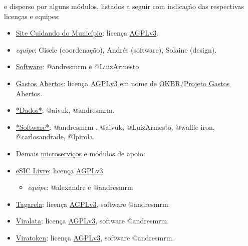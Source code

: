 \documentclass[letterpaper,10pt,english]{sphinxmanual}
\begin{document}
e disperso por alguns módulos, listados a seguir com indicação das
respectivas licenças e equipes:
\begin{itemize}
\item {} 
\href{https://github.com/okfn-brasil/cuidando2.git}{Site Cuidando do
Município}: licença \href{https://github.com/okfn-brasil/cuidando2/blob/master/LICENSE.txt}{AGPLv3}.

\item {} 
\emph{equipe}: Gisele (coordenação), Andrés (software), Solaine (design).

\item {} 
\href{https://github.com/okfn-brasil/cuidando2/graphs/contributors}{Software}:
@andresmrm e @LuizArmesto

\item {} 
\href{https://github.com/okfn-brasil/gastos\_abertos}{Gastos Abertos}:
licença \href{https://github.com/okfn-brasil/gastos\_abertos/blob/master/LICENSE}{AGPLv3}
em nome de \href{http://br.okfn.org/}{OKBR}/\href{http://wiki.okfn.org/Open\_Knowledge\_Brasil/Gastos\_Abertos}{Projeto Gastos
Abertos}.

\item {} 
\href{https://github.com/okfn-brasil/gastos\_abertos/commits/master/data}{*Dados*}:
@aivuk, @andresmrm.

\item {} 
\href{https://github.com/okfn-brasil/gastos\_abertos/graphs/contributors}{*Software*}:
@andresmrm , @aivuk, @LuizArmesto, @waffle-iron, @carlosandrade,
@lpirola.

\item {} 
Demais
\href{https://en.wikipedia.org/wiki/Microservices}{microserviços} e
módulos de apoio:

\item {} 
\href{https://github.com/okfn-brasil/esiclivre}{eSIC Livre}: licença \href{https://github.com/okfn-brasil/esiclivre/blob/master/LICENSE.txt}{AGPLv3}.
\begin{itemize}
\item {} 
\emph{equipe}: @alexandre e @andresmrm

\end{itemize}

\item {} 
\href{https://github.com/okfn-brasil/tagarela}{Tagarela}: licença \href{https://github.com/okfn-brasil/tagarela/blob/master/LICENSE.txt}{AGPLv3},
software @andresmrm.

\item {} 
\href{https://github.com/okfn-brasil/viralata}{Viralata}: licença \href{https://github.com/okfn-brasil/viralata/blob/master/LICENSE.txt}{AGPLv3},
software @andresmrm.

\item {} 
\href{https://github.com/okfn-brasil/viratoken}{Viratoken}: licença \href{https://github.com/okfn-brasil/viratoken/blob/master/LICENSE.txt}{AGPLv3},
software @andresmrm.

\end{itemize}
\end{document}
